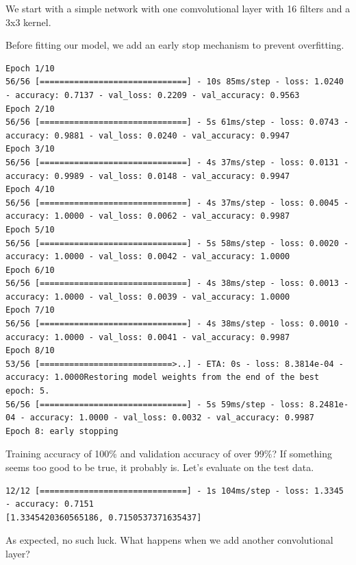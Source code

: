 \documentclass{article}
\begin{document}
We start with a simple network with one comvolutional layer with 16 filters and a 3x3 kernel.



Before fitting our model, we add an early stop mechanism to prevent overfitting.



\begin{lstlisting}[style=output]
Epoch 1/10
56/56 [==============================] - 10s 85ms/step - loss: 1.0240 - accuracy: 0.7137 - val_loss: 0.2209 - val_accuracy: 0.9563
Epoch 2/10
56/56 [==============================] - 5s 61ms/step - loss: 0.0743 - accuracy: 0.9881 - val_loss: 0.0240 - val_accuracy: 0.9947
Epoch 3/10
56/56 [==============================] - 4s 37ms/step - loss: 0.0131 - accuracy: 0.9989 - val_loss: 0.0148 - val_accuracy: 0.9947
Epoch 4/10
56/56 [==============================] - 4s 37ms/step - loss: 0.0045 - accuracy: 1.0000 - val_loss: 0.0062 - val_accuracy: 0.9987
Epoch 5/10
56/56 [==============================] - 5s 58ms/step - loss: 0.0020 - accuracy: 1.0000 - val_loss: 0.0042 - val_accuracy: 1.0000
Epoch 6/10
56/56 [==============================] - 4s 38ms/step - loss: 0.0013 - accuracy: 1.0000 - val_loss: 0.0039 - val_accuracy: 1.0000
Epoch 7/10
56/56 [==============================] - 4s 38ms/step - loss: 0.0010 - accuracy: 1.0000 - val_loss: 0.0041 - val_accuracy: 0.9987
Epoch 8/10
53/56 [===========================>..] - ETA: 0s - loss: 8.3814e-04 - accuracy: 1.0000Restoring model weights from the end of the best epoch: 5.
56/56 [==============================] - 5s 59ms/step - loss: 8.2481e-04 - accuracy: 1.0000 - val_loss: 0.0032 - val_accuracy: 0.9987
Epoch 8: early stopping
\end{lstlisting}

Training accuracy of 100\% and validation accuracy of over 99\%? If something seems too good to be true, it probably is. Let's evaluate on the test data.



\begin{lstlisting}[style=output]
12/12 [==============================] - 1s 104ms/step - loss: 1.3345 - accuracy: 0.7151
[1.3345420360565186, 0.7150537371635437] 
\end{lstlisting}

As expected, no such luck. What happens when we add another convolutional layer?
\end{document}
